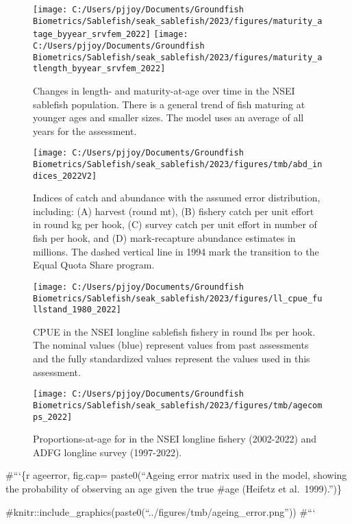 \documentclass[
]{article}
\begin{document}
\begin{figure}[H]
\texttt{[image: C:/Users/pjjoy/Documents/Groundfish Biometrics/Sablefish/seak\_sablefish/2023/figures/maturity\_atage\_byyear\_srvfem\_2022]} \texttt{[image: C:/Users/pjjoy/Documents/Groundfish Biometrics/Sablefish/seak\_sablefish/2023/figures/maturity\_atlength\_byyear\_srvfem\_2022]} \caption{Changes in length- and maturity-at-age over time in the NSEI sablefish population.  There is a general trend of fish maturing at younger ages and smaller sizes.  The model uses an average of all years for the assessment.}\label{fig:deltamat}
\end{figure}

\begin{figure}[H]
\texttt{[image: C:/Users/pjjoy/Documents/Groundfish Biometrics/Sablefish/seak\_sablefish/2023/figures/tmb/abd\_indices\_2022V2]} \caption{Indices of catch and abundance with the assumed error distribution, including: (A) harvest (round mt), (B) fishery catch per unit effort in round kg per hook, (C) survey catch per unit effort in number of fish per hook, and (D) mark-recapture abundance estimates in millions. The dashed vertical line in 1994 mark the transition to the Equal Quota Share program.}\label{fig:abdind}
\end{figure}

\begin{figure}[H]
\texttt{[image: C:/Users/pjjoy/Documents/Groundfish Biometrics/Sablefish/seak\_sablefish/2023/figures/ll\_cpue\_fullstand\_1980\_2022]} \caption{CPUE in the NSEI longline sablefish fishery in round lbs per hook.  The nominal values (blue) represent values from past assessments and the fully standardized values represent the values used in this assessment.}\label{fig:fcpuestand}
\end{figure}

\begin{figure}[H]
\texttt{[image: C:/Users/pjjoy/Documents/Groundfish Biometrics/Sablefish/seak\_sablefish/2023/figures/tmb/agecomps\_2022]} \caption{Proportions-at-age for in the NSEI longline fishery (2002-2022) and ADFG longline survey (1997-2022).}\label{fig:agecomps}
\end{figure}

\#```\{r ageerror, fig.cap= paste0(``Ageing error matrix used in the model, showing the probability of observing an age given the true \#age (Heifetz et al.~1999).'')\}

\#knitr::include\_graphics(paste0(``../figures/tmb/ageing\_error.png''))
\#```
\end{document}
